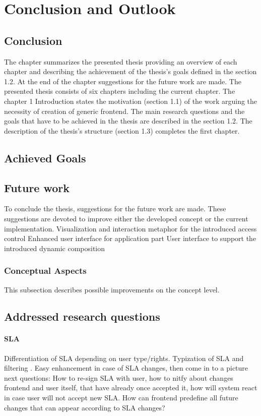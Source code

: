 \chapter{Conclusion and Outlook}

\section{Conclusion}
	The chapter summarizes the presented thesis providing an overview of each chapter and describing the achievement of the thesis’s goals defined in the section 1.2. At the end of the chapter suggestions for the future work are made.
	The presented thesis consists of six chapters including the current chapter. The chapter 1 Introduction states the motivation (section 1.1) of the work arguing the necessity of creation of generic frontend. The main research questions and the goals that have to be achieved in the thesis are described in the section 1.2. The description of the thesis’s structure (section 1.3) completes the first chapter.
\section{Achieved Goals}

\section{Future work}
	To conclude the thesis, suggestions for the future work are made. These suggestions
	are devoted to improve either the developed concept or the current implementation.
	\newline
	Visualization and interaction metaphor for the introduced access control
	\newline
	Enhanced user interface for application part
	\newline
	User interface to support the introduced dynamic composition

	\subsection{Conceptual Aspects}
	This subsection describes possible improvements on the concept level.
	\section{Addressed research questions}
		\subsubsection {SLA}
		Differentiation of SLA depending on user type/rights. Typization of SLA and filtering . Easy enhancement in case of SLA changes, then come in to a picture next questions: How to re-sign SLA with user, how to nitfy about changes frontend and user itself, that have already once accepted it, how will system react in case user will not accept new SLA. How can frontend predefine all future changes that can appear according to SLA changes?
